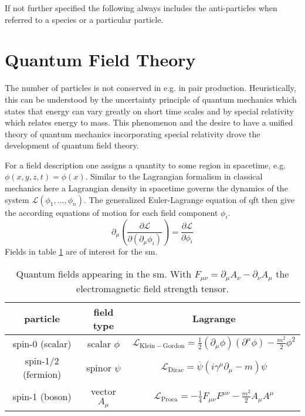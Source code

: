 If not further specified the following always includes the anti-particles when referred to a species or a particular particle.

\section{Quantum Field Theory}
The number of particles is not conserved in e.g. in pair production. Heuristically, this can be understood by the uncertainty principle of quantum mechanics which states that energy can vary greatly on short time scales and by special relativity which relates energy to mass. This phenomenon and the desire to have a unified theory of quantum mechanics incorporating special relativity drove the development of quantum field theory.

For a field description one assigns a quantity to some region in spacetime, e.g. $\phi(x,y,z,t)=\phi(x)$. Similar to the Lagrangian formalism in classical mechanics here a Lagrangian density in spacetime governs the dynamics of the system $\mathcal{L}(\phi_1,...,\phi_n)$. The generalized Euler-Lagrange equation of qft then give the according equations of motion for each field component $\phi_i$.
\begin{equation}
    \partial_\mu \left(\frac{\partial\mathcal{L}}{\partial(\partial_\mu\phi_i)}\right)=\frac{\partial\mathcal{L}}{\partial \phi_i}
\end{equation}
Fields in table \ref{tab:fields} are of interest for the \ac{sm}.
\begin{table}
    \begin{center}
        \begin{tabular}{c|c|c}
            particle           & field type                  & Lagrange                                                                                                     \\ [1ex]  \hline
            spin-0 (scalar)    & scalar $\phi$   & $\mathcal{L}_\mathrm{Klein-Gordon}=\frac{1}{2} (\partial_\mu \phi )(\partial^\mu \phi)-\frac{m^2}{2}\phi^2 $ \\  [1.5ex]
            spin-1/2 (fermion) & spinor $\psi$   & $\mathcal{L}_\mathrm{Dirac}= \overline{\psi}(i \gamma^\mu \partial_\mu - m )\psi$                            \\  [1.5ex]
            spin-1 (boson)     & vector  $A_\mu$ & $\mathcal{L}_\mathrm{Proca}= -\frac{1}{4}F_{\mu\nu}F^{\mu\nu} -\frac{m^2}{2} A_\mu A^\mu$                    \\  [2ex]
        \end{tabular}
        \caption{Quantum fields appearing in the \ac{sm}. With $F_{\mu\nu}=\partial_\mu A_\nu - \partial_\nu A_\mu$ the electromagnetic field strength tensor.}
        \label{tab:fields}
    \end{center}
\end{table}

